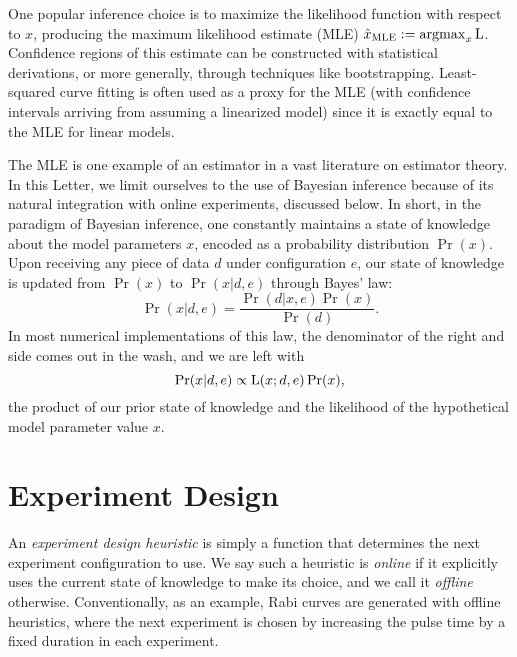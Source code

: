 \documentclass[aps,prl,twocolumn,superscriptaddress]{revtex4}
\newcommand{\mps}{x}
\newcommand{\eps}{e}
\newcommand{\data}{d}
\newcommand{\MLE}{\text{MLE}}
\begin{document}
One popular inference choice is to maximize the likelihood function
with respect to $\mps$, producing the maximum likelihood estimate (MLE) 
$\hat{\mps}_\MLE:=\operatorname{argmax}_\mps \Lhood$.
Confidence regions of this estimate can be constructed 
with statistical derivations, or more generally, through techniques like bootstrapping.
Least-squared curve fitting is often used as a proxy for the MLE (with 
confidence intervals arriving from assuming
a linearized model) since it is exactly equal to the MLE
for linear models.

The MLE is one example of an estimator in a vast literature on estimator theory.
In this Letter, we limit ourselves to the use of Bayesian inference because of its
natural integration with online experiments, discussed below.
In short, in the paradigm of Bayesian inference, one constantly
maintains a state of knowledge about the model parameters $\mps$, encoded
as a probability distribution $\Pr(\mps)$.
Upon receiving any piece of data $\data$ under configuration $\eps$,
our state of knowledge is updated from $\Pr(\mps)$ to $\Pr(\mps|\data,\eps)$
through Bayes' law:
\begin{equation}
    \Pr(\mps|\data,\eps)
        = \frac{\Pr(\data|\mps,\eps)\Pr(\mps)}{\Pr(d)}.
\end{equation}
In most numerical implementations of this law, the denominator of the 
right and side comes out in the wash, and we are left with
\begin{equation}
    \Pr(\mps|\data,\eps)
        \propto \Lhood(\mps;\data,\eps)\Pr(\mps),
\end{equation}
the product of our prior state of knowledge and the likelihood
of the hypothetical model parameter value $\mps$.

\section{Experiment Design}
\label{sec:experiment-design}

An \textit{experiment design heuristic} is simply a function that 
determines the next experiment configuration to use.
We say such a heuristic is \textit{online} if it explicitly uses the current
state of knowledge to make its choice, and we call it \textit{offline} 
otherwise.
Conventionally, as an example, Rabi curves are generated 
with offline heuristics, where the next experiment is chosen by 
increasing the pulse time by a fixed duration in each experiment.
\end{document}

